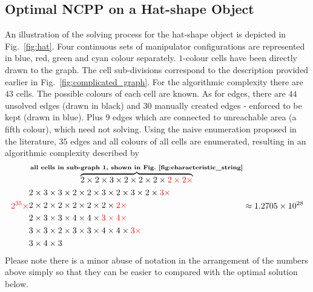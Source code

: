 \documentclass[conference]{IEEEtran}
\begin{document}
\subsection{Optimal NCPP on a Hat-shape Object}
An illustration of the solving process for the hat-shape object is depicted in Fig.~\ref{fig:hat}. 
Four continuous sets of manipulator configurations are represented in blue, red, green and cyan colour separately. $1$-colour cells have been directly drawn to the graph. 
The cell sub-divisions correspond to the description provided earlier in Fig.~\ref{fig:complicated_graph}.
For the algorithmic complexity there are $43$ cells. The possible colours of each cell are known. As for edges, there are $44$ unsolved edges (drawn in black) and $30$ manually created edges - enforced to be kept (drawn in blue). Plus $9$ edges which are connected to unreachable area (a fifth colour), which need not solving. Using the naive enumeration proposed in the literature, %
$35$ edges and all colours of all cells are enumerated, resulting in an algorithmic complexity described by 
\begin{equation}
{\color{red}2^{35}\times}
\begin{aligned}
&\overbrace{2\times2\times3\times2\times2\times2\times{\color{red}2\times2\times}}^{\textbf{all cells in sub-graph 1, shown in Fig.~\ref{fig:characteristic_string}}}\\
&2\times3\times3\times2\times2\times3\times2\times3\times2\times{\color{red}3\times}\\
&2\times2\times2\times2\times2\times2\times{\color{red}2\times}\\
&2\times3\times3\times4\times4\times{\color{red}3\times4\times}\\
&3\times3\times2\times3\times3\times4\times4\times{\color{red}3\times}\\
&3\times4\times3
\end{aligned}
\approx 1.2705\times10^{28}
\end{equation}
Please note there is a minor abuse of notation in the arrangement of the numbers above simply so that they can be easier to compared with the optimal solution below. 
\end{document}
